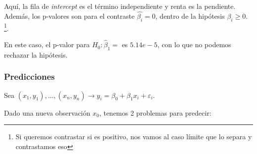 Aquí, la fila de \textit{intercept} es el término independiente y renta es la pendiente. Además, los p-valores son para el contraste $\hat{β_i} = 0$, dentro de la hipótesis $β_i \geq 0$. \footnote{Si queremos contrastar si es positivo, nos vamos al caso límite que lo separa y contrastamos eso}.

En este caso, el p-valor para $H_0: \hat{β}_1=$ es $5.14e-5$, con lo que no podemos rechazar la hipótesis.


\subsubsection{Predicciones}

Sea $(x_1,y_1),...,(x_n,y_n) \to y_i = β_0 + β_1x_i + ε_i$.

Dado una nueva observación $x_0$, tenemos 2 problemas para predecir:

